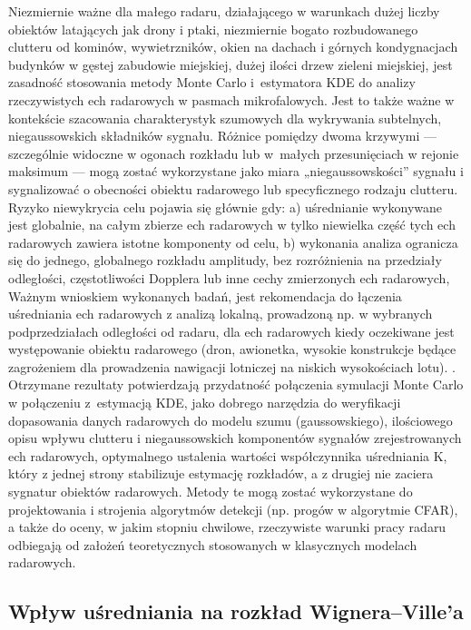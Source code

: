 Niezmiernie ważne dla małego radaru, działającego w warunkach dużej liczby obiektów latających jak drony i ptaki, niezmiernie bogato rozbudowanego clutteru od kominów, wywietrzników, okien na dachach i górnych kondygnacjach budynków w gęstej zabudowie miejskiej, dużej ilości drzew zieleni miejskiej, jest zasadność stosowania metody Monte Carlo i~estymatora KDE do analizy rzeczywistych ech radarowych w pasmach mikrofalowych. Jest to także ważne w kontekście szacowania charakterystyk szumowych dla wykrywania subtelnych, niegaussowskich składników sygnału. Różnice pomiędzy dwoma krzywymi — szczególnie widoczne w ogonach rozkładu lub w~małych przesunięciach w rejonie maksimum — mogą zostać wykorzystane jako miara „niegaussowskości” sygnału i sygnalizować o obecności obiektu radarowego lub specyficznego rodzaju clutteru. 
Ryzyko niewykrycia celu pojawia się głównie gdy:
a) uśrednianie wykonywane jest globalnie, na całym zbierze ech radarowych w tylko niewielka część tych ech radarowych zawiera istotne komponenty od celu,
b) wykonania analiza ogranicza się do jednego, globalnego rozkładu amplitudy, bez rozróżnienia na przedziały odległości, częstotliwości Dopplera lub inne cechy zmierzonych ech radarowych,
Ważnym wnioskiem wykonanych badań, jest rekomendacja do łączenia uśredniania ech radarowych z analizą lokalną, prowadzoną np. w wybranych podprzedziałach odległości od radaru, dla ech radarowych kiedy oczekiwane jest występowanie obiektu radarowego (dron, awionetka, wysokie konstrukcje będące zagrożeniem dla prowadzenia nawigacji lotniczej na niskich wysokościach lotu). . 
Otrzymane rezultaty potwierdzają przydatność połączenia symulacji Monte Carlo w połączeniu z~estymacją KDE, jako dobrego narzędzia do weryfikacji dopasowania danych radarowych do modelu szumu (gaussowskiego), ilościowego opisu wpływu clutteru i niegaussowskich komponentów sygnałów zrejestrowanych ech radarowych, optymalnego ustalenia wartości współczynnika uśredniania K, który z jednej strony stabilizuje estymację rozkładów, a z drugiej nie zaciera sygnatur obiektów radarowych. Metody te mogą zostać wykorzystane do projektowania i strojenia algorytmów detekcji (np. progów w algorytmie CFAR), a także do oceny, w jakim stopniu chwilowe, rzeczywiste warunki pracy radaru odbiegają od założeń teoretycznych stosowanych w klasycznych modelach radarowych. 
\subsection{Wpływ uśredniania na rozkład Wignera--Ville'a}

